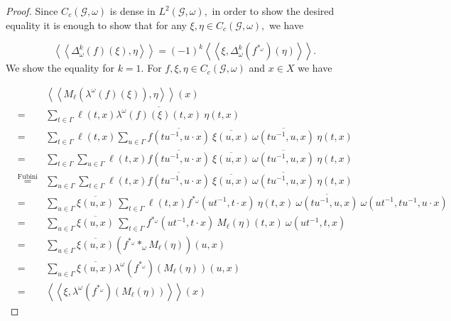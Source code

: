 \documentclass[a4paper,11pt,reqno]{amsart}
\theoremstyle{plain}
\theoremstyle{mainthmstyle}
\theoremstyle{named}
\numberwithin{equation}{section}
\newcommand{\Bea}{\begin{eqnarray*}}
\newcommand{\Eea}{\end{eqnarray*}}
\begin{document}
\begin{proof}
Since $C_c (\mathcal G, \omega)$ is dense in $L^2 (\mathcal G, \omega),$ in order to show the desired equality it is enough to show that for any $\xi, \eta \in C_c (\mathcal G, \omega),$ we have

$$\left \langle \left \langle \Delta_{\omega}^k (f) (\xi), \eta \right \rangle \right \rangle = (-1)^k \left \langle \left\langle \xi, \Delta_{\omega}^k (f^{\ast_{\omega}}) (\eta) \right \rangle \right \rangle.$$
We show the equality for $k = 1.$ For $f, \xi, \eta \in C_c (\mathcal G, \omega)$ and $x \in X$ we have

\Bea 
&& \left \langle \left \langle M_{\ell} (\lambda^{\omega} (f) (\xi)), \eta \right \rangle \right \rangle (x) \\ & = & \sum\limits_{t \in \Gamma} \ell (t,x) \overline {\lambda^{\omega} (f) (\xi) (t,x)}\ \eta (t, x) \\ & = & \sum\limits_{t \in \Gamma} \ell (t, x) \sum\limits_{u \in \Gamma} \overline {f \left (t u^{-1}, u \cdot x \right )}\ \overline {\xi (u, x)}\ \overline {\omega (t u^{-1}, u, x)}\ \eta (t,x) \\ & = & \sum\limits_{t \in \Gamma} \sum\limits_{u \in \Gamma} \ell (t, x) \overline {f \left (t u^{-1}, u \cdot x \right )}\ \overline {\xi (u, x)}\ \overline {\omega (t u^{-1}, u, x)}\ \eta (t,x) \\ & \stackrel{\text {Fubini}}{=} & \sum\limits_{u \in \Gamma} \sum\limits_{t \in \Gamma} \ell (t, x) \overline {f \left (t u^{-1}, u \cdot x \right )}\ \overline {\xi (u, x)}\ \overline {\omega (t u^{-1}, u, x)}\ \eta (t,x) \\ & = & \sum\limits_{u \in \Gamma} \overline {\xi (u, x)}\ \sum\limits_{t \in \Gamma} \ell (t, x) f^{\ast_{\omega}} \left (u t^{-1}, t \cdot x \right )\ \eta (t,x)\ \overline {\omega (t u^{-1}, u, x)}\ \omega (u t^{-1}, t u^{-1}, u \cdot x)  \\ & = & \sum\limits_{u \in \Gamma} \overline {\xi (u, x)}\ \sum\limits_{t \in \Gamma} f^{\ast_{\omega}} \left (u t^{-1}, t \cdot x \right )\ M_{\ell} (\eta) (t,x)\ \omega (u t^{-1}, t, x) \\ & = & \sum\limits_{u \in \Gamma} \overline {\xi (u, x)} \left (f^{\ast_{\omega}} \ast_{\omega} M_{\ell} (\eta) \right ) (u,x) \\ & = & \sum\limits_{u \in \Gamma} \overline {\xi (u, x)} \lambda^{\omega} (f^{\ast_{\omega}}) \left (M_{\ell} (\eta) \right ) (u, x) \\ & = & \left \langle \left \langle \xi, \lambda^{\omega} (f^{\ast_{\omega}}) \left (M_{\ell} (\eta) \right ) \right \rangle \right \rangle (x) \  
\Eea


\end{proof}
\end{document}
